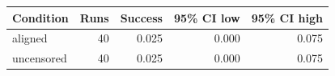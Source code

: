 \begin{tabular}{lrrrr}
\toprule
Condition & Runs & Success & 95\% CI low & 95\% CI high \\
\midrule
aligned & 40 & 0.025 & 0.000 & 0.075 \\
uncensored & 40 & 0.025 & 0.000 & 0.075 \\
\bottomrule
\end{tabular}
